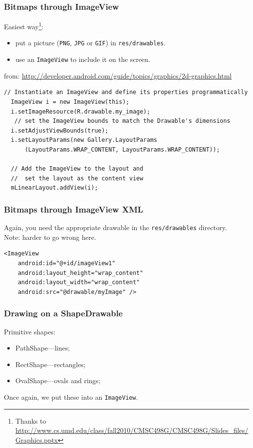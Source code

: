 \begin{frame}[fragile]
\frametitle{Bitmaps through ImageView}

\begin{changemargin}{1cm}
Easiest way\footnote{Thanks to \scriptsize \url{http://www.cs.umd.edu/class/fall2010/CMSC498G/CMSC498G/Slides_files/Graphics.pptx}}: 
\begin{itemize}
\item put a picture ({\tt PNG}, {\tt JPG} or {\tt GIF}) in {\tt res/drawables}.
\item use an {\tt ImageView} to include it on the screen.
\end{itemize}
\end{changemargin}

{\tiny from: \url{http://developer.android.com/guide/topics/graphics/2d-graphics.html}}

\begin{lstlisting}[basicstyle=\scriptsize]
  // Instantiate an ImageView and define its properties programmatically
  ImageView i = new ImageView(this);
  i.setImageResource(R.drawable.my_image);
   // set the ImageView bounds to match the Drawable's dimensions
  i.setAdjustViewBounds(true);
  i.setLayoutParams(new Gallery.LayoutParams
      (LayoutParams.WRAP_CONTENT, LayoutParams.WRAP_CONTENT));

  // Add the ImageView to the layout and 
  //  set the layout as the content view
  mLinearLayout.addView(i);
\end{lstlisting}
\end{frame}


\begin{frame}[fragile]
\frametitle{Bitmaps through ImageView XML}

\begin{changemargin}{1cm}
Again, you need the appropriate drawable in the {\tt res/drawables} directory.\\[1em]
Note: harder to go wrong here.

\begin{lstlisting}[basicstyle=\scriptsize]
  <ImageView
    android:id="@+id/imageView1"
    android:layout_height="wrap_content"
    android:layout_width="wrap_content"
    android:src="@drawable/myImage" />
\end{lstlisting}
\end{changemargin}

\end{frame}

\begin{frame}[fragile]
\frametitle{Drawing on a ShapeDrawable}
\begin{changemargin}{1cm}
Primitive shapes: 
\begin{itemize}
\item PathShape---lines;
\item RectShape---rectangles;
\item OvalShape---ovals and rings;
\end{itemize}
Once again, we put these into an {\tt ImageView}.
\end{changemargin}
\end{frame}

